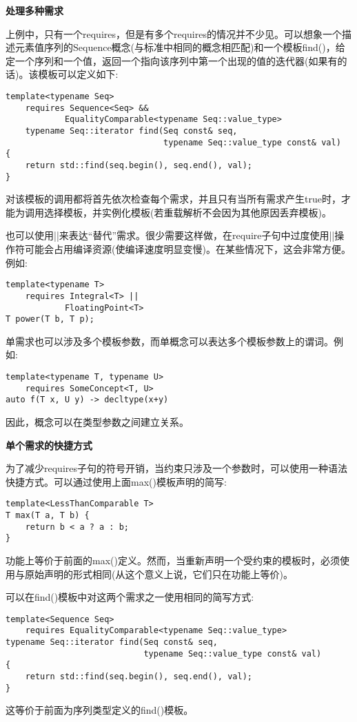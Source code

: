 \noindent
\textbf{处理多种需求}

上例中，只有一个requires，但是有多个requires的情况并不少见。可以想象一个描述元素值序列的Sequence概念(与标准中相同的概念相匹配)和一个模板find()，给定一个序列和一个值，返回一个指向该序列中第一个出现的值的迭代器(如果有的话)。该模板可以定义如下:

\begin{lstlisting}[style=styleCXX]
template<typename Seq>
	requires Sequence<Seq> &&
			EqualityComparable<typename Seq::value_type>
	typename Seq::iterator find(Seq const& seq,
								typename Seq::value_type const& val)
{
	return std::find(seq.begin(), seq.end(), val);
}
\end{lstlisting}

对该模板的调用都将首先依次检查每个需求，并且只有当所有需求产生true时，才能为调用选择模板，并实例化模板(若重载解析不会因为其他原因丢弃模板)。

也可以使用||来表达“替代”需求。很少需要这样做，在require子句中过度使用||操作符可能会占用编译资源(使编译速度明显变慢)。在某些情况下，这会非常方便。例如:

\begin{lstlisting}[style=styleCXX]
template<typename T>
	requires Integral<T> ||
			FloatingPoint<T>
T power(T b, T p);
\end{lstlisting}

单需求也可以涉及多个模板参数，而单概念可以表达多个模板参数上的谓词。例如:

\begin{lstlisting}[style=styleCXX]
template<typename T, typename U>
	requires SomeConcept<T, U>
auto f(T x, U y) -> decltype(x+y)
\end{lstlisting}

因此，概念可以在类型参数之间建立关系。

\noindent
\textbf{单个需求的快捷方式}

为了减少requires子句的符号开销，当约束只涉及一个参数时，可以使用一种语法快捷方式。可以通过使用上面max()模板声明的简写:

\begin{lstlisting}[style=styleCXX]
template<LessThanComparable T>
T max(T a, T b) {
	return b < a ? a : b;
}
\end{lstlisting}

功能上等价于前面的max()定义。然而，当重新声明一个受约束的模板时，必须使用与原始声明的形式相同(从这个意义上说，它们只在功能上等价)。

可以在find()模板中对这两个需求之一使用相同的简写方式:

\begin{lstlisting}[style=styleCXX]
template<Sequence Seq>
	requires EqualityComparable<typename Seq::value_type>
typename Seq::iterator find(Seq const& seq,
							typename Seq::value_type const& val)
{
	return std::find(seq.begin(), seq.end(), val);
}
\end{lstlisting}

这等价于前面为序列类型定义的find()模板。





